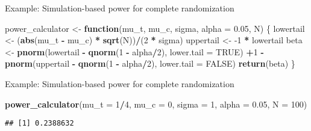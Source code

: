 \documentclass[
  ignorenonframetext,
]{beamer}
\newenvironment{Shaded}{\begin{snugshade}}{\end{snugshade}}
\newcommand{\ControlFlowTok}[1]{\textcolor[rgb]{0.13,0.29,0.53}{\textbf{#1}}}
\newcommand{\DataTypeTok}[1]{\textcolor[rgb]{0.13,0.29,0.53}{#1}}
\newcommand{\DecValTok}[1]{\textcolor[rgb]{0.00,0.00,0.81}{#1}}
\newcommand{\FloatTok}[1]{\textcolor[rgb]{0.00,0.00,0.81}{#1}}
\newcommand{\KeywordTok}[1]{\textcolor[rgb]{0.13,0.29,0.53}{\textbf{#1}}}
\newcommand{\NormalTok}[1]{#1}
\newcommand{\OperatorTok}[1]{\textcolor[rgb]{0.81,0.36,0.00}{\textbf{#1}}}
\newcommand{\OtherTok}[1]{\textcolor[rgb]{0.56,0.35,0.01}{#1}}
\newcommand{\StringTok}[1]{\textcolor[rgb]{0.31,0.60,0.02}{#1}}
\begin{document}
\begin{frame}[fragile]{Example: Simulation-based power for complete
randomization}
\protect\hypertarget{example-simulation-based-power-for-complete-randomization}{}
\begin{Shaded}
\begin{Highlighting}[]
\NormalTok{power\_calculator \textless{}{-}}\StringTok{ }\ControlFlowTok{function}\NormalTok{(mu\_t, mu\_c,}
\NormalTok{    sigma, }\DataTypeTok{alpha =} \FloatTok{0.05}\NormalTok{, N) \{}
\NormalTok{    lowertail \textless{}{-}}\StringTok{ }\NormalTok{(}\KeywordTok{abs}\NormalTok{(mu\_t }\OperatorTok{{-}}\StringTok{ }\NormalTok{mu\_c) }\OperatorTok{*}\StringTok{ }\KeywordTok{sqrt}\NormalTok{(N))}\OperatorTok{/}\NormalTok{(}\DecValTok{2} \OperatorTok{*}
\StringTok{        }\NormalTok{sigma)}
\NormalTok{    uppertail \textless{}{-}}\StringTok{ }\DecValTok{{-}1} \OperatorTok{*}\StringTok{ }\NormalTok{lowertail}
\NormalTok{    beta \textless{}{-}}\StringTok{ }\KeywordTok{pnorm}\NormalTok{(lowertail }\OperatorTok{{-}}\StringTok{ }\KeywordTok{qnorm}\NormalTok{(}\DecValTok{1} \OperatorTok{{-}}\StringTok{ }\NormalTok{alpha}\OperatorTok{/}\DecValTok{2}\NormalTok{),}
        \DataTypeTok{lower.tail =} \OtherTok{TRUE}\NormalTok{)}
    \OperatorTok{+}\DecValTok{1} \OperatorTok{{-}}\StringTok{ }\KeywordTok{pnorm}\NormalTok{(uppertail }\OperatorTok{{-}}\StringTok{ }\KeywordTok{qnorm}\NormalTok{(}\DecValTok{1} \OperatorTok{{-}}\StringTok{ }\NormalTok{alpha}\OperatorTok{/}\DecValTok{2}\NormalTok{),}
        \DataTypeTok{lower.tail =} \OtherTok{FALSE}\NormalTok{)}
    \KeywordTok{return}\NormalTok{(beta)}
\NormalTok{\}}
\end{Highlighting}
\end{Shaded}
\end{frame}

\begin{frame}[fragile]{Example: Simulation-based power for complete
randomization}
\protect\hypertarget{example-simulation-based-power-for-complete-randomization-1}{}
\begin{Shaded}
\begin{Highlighting}[]
\KeywordTok{power\_calculator}\NormalTok{(}\DataTypeTok{mu\_t =} \DecValTok{1}\OperatorTok{/}\DecValTok{4}\NormalTok{, }\DataTypeTok{mu\_c =} \DecValTok{0}\NormalTok{, }\DataTypeTok{sigma =} \DecValTok{1}\NormalTok{,}
    \DataTypeTok{alpha =} \FloatTok{0.05}\NormalTok{, }\DataTypeTok{N =} \DecValTok{100}\NormalTok{)}
\end{Highlighting}
\end{Shaded}

\begin{verbatim}
## [1] 0.2388632
\end{verbatim}
\end{frame}
\end{document}
